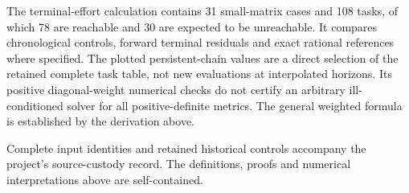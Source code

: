 The terminal-effort calculation contains 31 small-matrix cases and 108 tasks, of which 78 are reachable and 30 are expected to be unreachable. It compares chronological controls, forward terminal residuals and exact rational references where specified. The plotted persistent-chain values are a direct selection of the retained complete task table, not new evaluations at interpolated horizons. Its positive diagonal-weight numerical checks do not certify an arbitrary ill-conditioned solver for all positive-definite metrics. The general weighted formula is established by the derivation above.

Complete input identities and retained historical controls accompany the project's source-custody record. The definitions, proofs and numerical interpretations above are self-contained.



